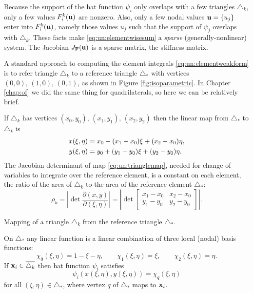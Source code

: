 Because the support of the hat function $\psi_i$ only overlaps with a few triangles $\triangle_k$, only a few values $F_i^k(\mathbf{u})$ are nonzero.  Also, only a few nodal values $\mathbf{u}=\{u_j\}$ enter into $F_i^k(\mathbf{u})$, namely those values $u_j$ such that the support of $\psi_j$ overlaps with $\triangle_k$.  These facts make \eqref{eq:un:elementwisesum} a \emph{sparse} (generally-nonlinear) system.  The Jacobian $J_{\mathbf{F}}(\mathbf{u})$ is a sparse matrix, the stiffness matrix.

A standard approach to computing the element integrals \eqref{eq:un:elementweakform} is to refer triangle $\triangle_k$ to a reference triangle $\triangle_\ast$ with vertices $(0,0),\,(1,0),\,(0,1)$, as shown in Figure \ref{fig:isoparametric}.  In Chapter \ref{chap:of} we did the same thing for quadrilaterals, so here we can be relatively brief.

If $\triangle_k$ has vertices $(x_0,y_0),\,(x_1,y_1),\,(x_2,y_2)$ then the linear map from $\triangle_\ast$ to $\triangle_k$ is
\begin{align}
x(\xi,\eta) &= x_0 + (x_1-x_0) \xi + (x_2-x_0) \eta, \label{eq:un:trianglemap} \\
y(\xi,\eta) &= y_0 + (y_1-y_0) \xi + (y_2-y_0) \eta. \notag
\end{align}
The Jacobian determinant of map \eqref{eq:un:trianglemap}, needed for change-of-variables to integrate over the reference element, is a constant on each element, the ratio of the area of $\triangle_k$ to the area of the reference element $\triangle_\ast$:
\begin{equation}
\rho_k = \left|\det \frac{\partial (x,y)}{\partial (\xi,\eta)}\right| = \left|\det \begin{bmatrix} x_1-x_0 & x_2-x_0 \\ y_1-y_0 & y_2-y_0 \end{bmatrix}\right|.  \label{eq:un:trianglejacobian}
\end{equation}

\begin{marginfigure}

\caption{Mapping of a triangle $\triangle_k$ from the reference triangle $\triangle_\ast$.}
\label{fig:isoparametric}
\end{marginfigure}

On $\triangle_\ast$ any linear function is a linear combination of three local (nodal) basis functions:
\begin{equation}
\chi_0(\xi,\eta) = 1-\xi-\eta, \qquad \chi_1(\xi,\eta) = \xi, \qquad \chi_2(\xi,\eta) = \eta. \label{eq:un:chiformulas}
\end{equation}
If $\mathbf{x}_i\in\overline{\triangle_k}$ then hat function $\psi_i$ satisfies
\begin{equation}
\psi_i(x(\xi,\eta),y(\xi,\eta)) = \chi_q(\xi,\eta) \label{eq:un:phichimap}
\end{equation}
for all $(\xi,\eta)\in\triangle_\ast$, where vertex $q$ of $\triangle_\ast$ maps to $\mathbf{x}_i$.

